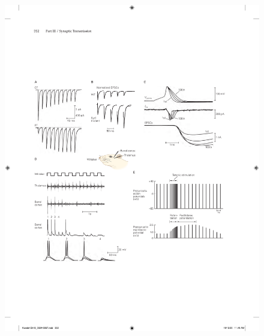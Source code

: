 \begin{figure}[htbp]
	\centering
	\includegraphics[width=0.85\linewidth]{chap15/fig_15_15}

\end{figure}
